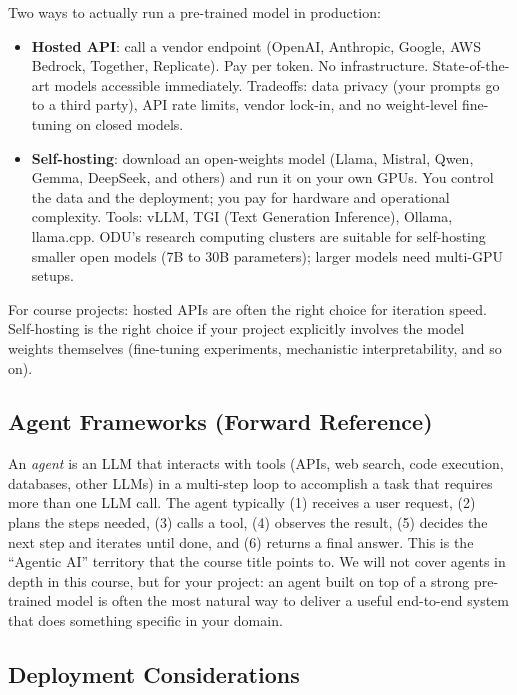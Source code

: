 \documentclass[11pt]{article}
\theoremstyle{remark}
\begin{document}
Two ways to actually run a pre-trained model in production:
\begin{itemize}[noitemsep]
    \item \textbf{Hosted API}: call a vendor endpoint (OpenAI, Anthropic, Google, AWS Bedrock, Together, Replicate). Pay per token. No infrastructure. State-of-the-art models accessible immediately. Tradeoffs: data privacy (your prompts go to a third party), API rate limits, vendor lock-in, and no weight-level fine-tuning on closed models.
    \item \textbf{Self-hosting}: download an open-weights model (Llama, Mistral, Qwen, Gemma, DeepSeek, and others) and run it on your own GPUs. You control the data and the deployment; you pay for hardware and operational complexity. Tools: vLLM, TGI (Text Generation Inference), Ollama, llama.cpp. ODU's research computing clusters are suitable for self-hosting smaller open models (7B to 30B parameters); larger models need multi-GPU setups.
\end{itemize}
For course projects: hosted APIs are often the right choice for iteration speed. Self-hosting is the right choice if your project explicitly involves the model weights themselves (fine-tuning experiments, mechanistic interpretability, and so on).

\subsection{Agent Frameworks (Forward Reference)}

An \emph{agent} is an LLM that interacts with tools (APIs, web search, code execution, databases, other LLMs) in a multi-step loop to accomplish a task that requires more than one LLM call. The agent typically (1) receives a user request, (2) plans the steps needed, (3) calls a tool, (4) observes the result, (5) decides the next step and iterates until done, and (6) returns a final answer. This is the ``Agentic AI'' territory that the course title points to. We will not cover agents in depth in this course, but for your project: an agent built on top of a strong pre-trained model is often the most natural way to deliver a useful end-to-end system that does something specific in your domain.

\subsection{Deployment Considerations}
\end{document}
